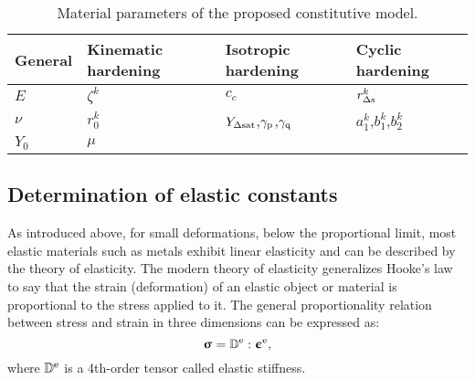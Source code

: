 \begin{table}[htbp]
  \centering
  \caption{Material parameters of the proposed constitutive model.}
    \begin{tabular}{llll}
    \toprule
    General & Kinematic hardening & Isotropic hardening & Cyclic hardening \\
    \midrule
    $E$   & $\zeta^k$ & $c_c$ & $r_{\Delta \rm{s}}^k$ \\
    $\nu$ & $r_0^k$ & $Y_{\Delta \rm{sat}}$,$\gamma_{\rm{p}}$,$\gamma_{\rm{q}}$ & $a_1^k$,$b_1^k$,$b_2^k$ \\
    $Y_0$ & $\mu$ &  & \\
    \bottomrule
    \end{tabular}%
  \label{tab:ParametersCollection}%
\end{table}%


\subsection{Determination of elastic constants}
\noindent
As introduced above, for small deformations, below the proportional limit, most elastic materials such as metals exhibit linear elasticity and can be described by the theory of elasticity.
The modern theory of elasticity generalizes Hooke's law to say that the strain (deformation) of an elastic object or material is proportional to the stress applied to it.
The general proportionality relation between stress and strain in three dimensions can be expressed as:
\begin{equation}
{\bm{\upsigma }} = {\mathbb{D}^{\rm{e}}}:{{\bm{\upepsilon }}^{\rm{e}}},
\label{Equ:HookesLaw}
\end{equation}
where ${\mathbb{D}^{\rm{e}}}$ is a 4th-order tensor called elastic stiffness.

